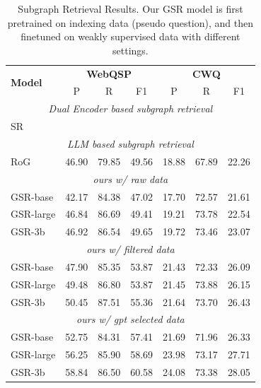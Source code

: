 \begin{table}[t]
    \centering
    \begin{tabular}{l|ccc|ccc}
    \toprule
        \multirow{2}{*}{\bf{Model}} & \multicolumn{3}{c}{\bf{WebQSP}} & \multicolumn{3}{|c}{\bf{CWQ}} \\ 
        & P & R & F1 & P & R & F1 \\ \midrule
        \multicolumn{7}{c}{\it{Dual Encoder based subgraph retrieval}} \\ 
        \midrule
        SR & \\ \midrule
        \multicolumn{7}{c}{\it{LLM based subgraph retrieval}} \\ \midrule 
        RoG & 46.90 & 79.85 & 49.56 & 18.88 & 67.89 & 22.26 \\
        \midrule
        \multicolumn{7}{c}{\it{ours w/ raw data}} \\ \midrule
        GSR-base & 42.17 & 84.38 & 47.02 & 17.70 & 72.57 & 21.61 \\
        GSR-large & 46.84 & 86.69 & 49.41 & 19.21 & 73.78 & 22.54 \\
        GSR-3b & 46.92 & 86.54 & 49.65 & 19.72 & 73.46 & 23.07 \\ \midrule 
        \multicolumn{7}{c}{\it{ours w/ filtered data}} \\ \midrule
        GSR-base & 47.90 & 85.35 & 53.87 & 21.43 & 72.33 & 26.09\\
        GSR-large & 49.48 & 86.80 & 53.87 & 21.45 & 73.88 & 26.15\\
        GSR-3b & 50.45 & 87.51 & 55.36 & 21.64 & 73.70 & 26.43 \\ 
        \midrule
        \multicolumn{7}{c}{\it{ours w/ gpt selected data}} \\ \midrule
        GSR-base & 52.75 & 84.31 & 57.41 & 21.69 & 71.96 & 26.33\\
        GSR-large & 56.25 & 85.90 & 58.69 & 23.98 & 73.17 & 27.71 \\
        GSR-3b & 58.84 & 86.50 & 60.58 & 24.08 & 73.38 & 28.05\\
        \bottomrule
    \end{tabular}
    \caption{Subgraph Retrieval Results. Our GSR model is first pretrained on indexing data (pseudo question), and then finetuned on weakly supervised data with different settings.}
    \label{tab:}
\end{table}
